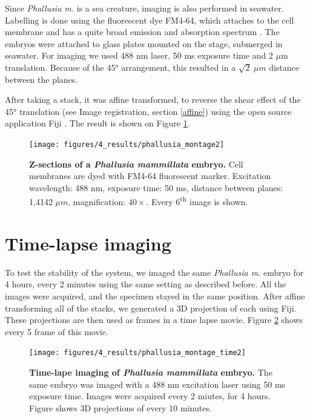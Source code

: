 \documentclass{diploma_style}
\begin{document}
Since \textit{Phallusia m.} is a sea creature, imaging is also performed in seawater. Labelling is done using the fluorescent dye FM4-64, which attaches to the cell membrane and has a quite broad emission and absorption spectrum \cite{bolte_FM-dyes_2004}. The embryos were attached to glass plates mounted on the stage, submerged in seawater. For imaging we used 488 nm laser, 50 ms exposure time and 2 $\mu$m translation. Because of the 45° arrangement, this resulted in a  $\sqrt{2}\ \mu m$ distance between the planes.

After taking a stack, it was affine transformed, to reverse the shear effect of the 45° translation (see Image registration, section \ref{affine}) using the open source application Fiji \cite{schindelin_fiji:_2012}. The result is shown on Figure \ref{fig:ph1}.


\begin{figure}[htbp]
	\centering
	\texttt{[image: figures/4\_results/phallusia\_montage2]}
	\caption{\textbf{Z-sections of a \textit{Phallusia mammillata} embryo.} Cell membranes are dyed with FM4-64 fluorescent marker. Excitation wavelength: 488 nm, exposure time: 50 ms, distance between planes: 1.4142 $\mu m$, magnification: $40\times$. Every 6\textsuperscript{th} image is shown.}
	\label{fig:ph1}
\end{figure}

\section{Time-lapse imaging}

To test the stability of the system, we imaged the same \textit{Phallusia m.} embryo for 4 hours, every 2 minutes using the same setting as described before. All the images were acquired, and the specimen stayed in the same position. After affine transforming all of the stacks, we generated a 3D projection of each using Fiji. These projections are then used as frames in a time lapse movie. Figure \ref{fig:ph2} shows every 5 frame of this movie.

\begin{figure}[htbp]
	\centering
	\texttt{[image: figures/4\_results/phallusia\_montage\_time2]}
	\caption{\textbf{Time-lape imaging of \textit{Phallusia mammillata} embryo.} The same embryo was imaged with a 488 nm excitation laser using 50 ms exposure time. Images were acquired every 2 miutes, for 4 hours. Figure shows 3D projections of every 10 minutes.}
	\label{fig:ph2}
\end{figure}
\end{document}
